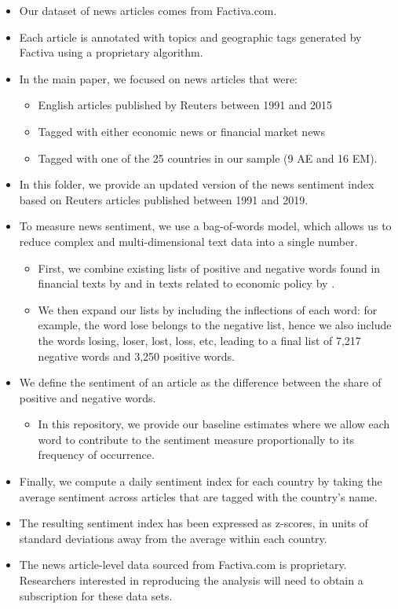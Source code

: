 \documentclass[11pt, fleqn]{article}
\begin{document}
\begin{itemize}
\item Our dataset of news articles comes from Factiva.com.
\item Each article is annotated with topics and geographic tags generated by Factiva using a proprietary algorithm.
\item In the main paper, we focused on news articles that were:
\begin{itemize}
\item English articles published by Reuters between 1991 and 2015
\item Tagged with either economic news or financial market news
\item Tagged with one of the 25 countries in our sample (9 AE and 16 EM).
\end{itemize}
\item In this folder, we provide an updated version of the news sentiment index based on Reuters articles published between 1991 and 2019.
\item To measure news sentiment, we use a bag-of-words model, which allows us to reduce complex and multi-dimensional text data into a single number.
\begin{itemize}
\item First, we combine existing lists of positive and negative words found in financial texts by \cite{loughran_mcdonald_2011} and in texts related to economic policy by \cite{young_soroka_2012}.
\item We then expand our lists by including the inflections of each word: for example, the word lose belongs to the negative list, hence we also include the words losing, loser, lost, loss, etc, leading to a final list of 7,217 negative words and 3,250 positive words.
\end{itemize}
\item We define the sentiment of an article as the difference between the share of positive and negative words.
\begin{itemize}
\item In this repository, we provide our baseline estimates where we allow each word to contribute to the sentiment measure proportionally to its frequency of occurrence.
\end{itemize}
\item Finally, we compute a daily sentiment index for each country by taking the average sentiment across articles that are tagged with the country's name.
\item The resulting sentiment index has been expressed as z-scores, in units of standard deviations away from the average within each country.
\item The news article-level data sourced from Factiva.com is proprietary. Researchers interested in reproducing the analysis will need to obtain a subscription for these data sets.
\end{itemize}
\end{document}
